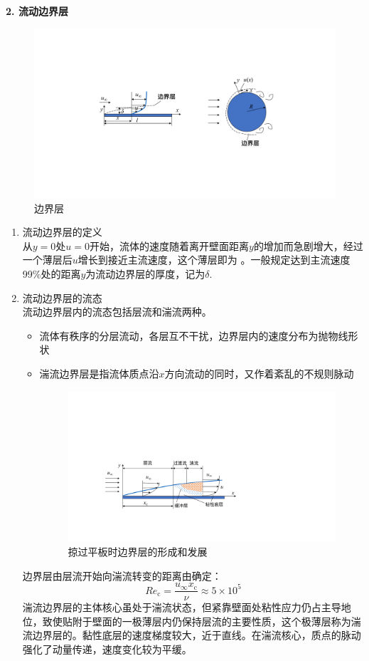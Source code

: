 \noindent \textbf{2. 流动边界层}
\begin{figure}[!htb]
	\centering
	\vspace*{-1em}
	\includegraphics[width=0.65\linewidth]{pic/边界层.pdf}
	\vspace*{-1em}
	\caption{边界层}
	\label{边界层}
\end{figure}
\begin{enumerate}[\hspace*{2em} (1)]
	\item 流动边界层的定义\\
	从$y=0$处$u=0$开始，流体的速度随着离开壁面距离$y$的增加而急剧增大，经过一个薄层后$u$增长到接近主流速度，这个薄层即为
。一般规定达到主流速度99\%处的距离$y$为流动边界层的厚度，记为$\delta$.
	
	\item 流动边界层的流态\\
	流动边界层内的流态包括层流和湍流两种。
	\begin{itemize}
		\item {}\quad 流体有秩序的分层流动，各层互不干扰，边界层内的速度分布为抛物线形状
		\item {}\quad 湍流边界层是指流体质点沿$x$方向流动的同时，又作着紊乱的不规则脉动
		
		\begin{figure}[!htb]
			\centering
			\includegraphics[width=0.6\linewidth]{pic/边界层的形成.pdf}
			\caption{掠过平板时边界层的形成和发展}
			\label{边界层的形成}
		\end{figure}
	
	\end{itemize}
		边界层由层流开始向湍流转变的距离由确定：
		\begin{equation}
			Re_{\text{c}} = \dfrac{u_\infty x_\text{c}}{\nu} \approx 5 \times 10^5
		\end{equation}
	\hspace*{2em}湍流边界层的主体核心虽处于湍流状态，但紧靠壁面处粘性应力仍占主导地位，致使贴附于壁面的一极薄层内仍保持层流的主要性质，这个极薄层称为湍流边界层的。黏性底层的速度梯度较大，近于直线。在湍流核心，质点的脉动强化了动量传递，速度变化较为平缓。
\end{enumerate}

